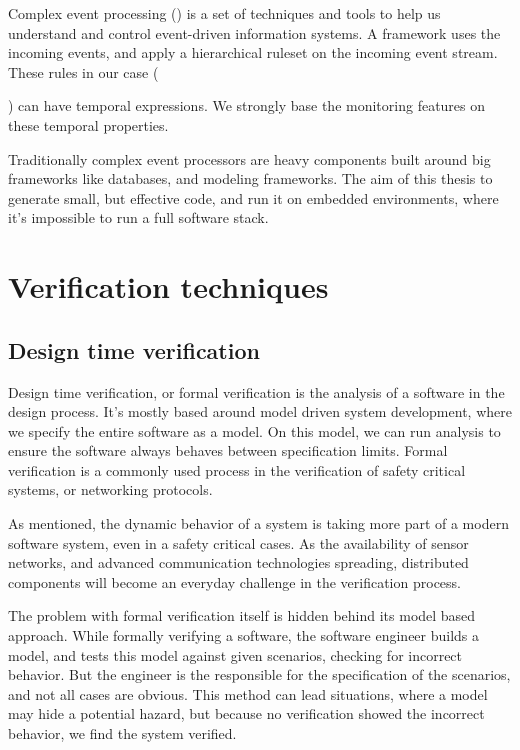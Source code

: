 Complex event processing () is a set of techniques and tools to help us understand and control event-driven information systems.\citep{Luckham:2001:PEI:515781} A  framework uses the incoming events, and apply a hierarchical ruleset on the incoming event stream. These rules in our case ({) can have temporal expressions. We strongly base the monitoring features on these temporal properties.

Traditionally complex event processors are heavy components built around big frameworks like databases, and modeling frameworks. The aim of this thesis to generate small, but effective code, and run it on embedded environments, where it's impossible to run a full  software stack.

\section{Verification techniques}

\subsection{Design time verification}

Design time verification, or formal verification is the analysis of a software in the design process. It's mostly based around model driven system development, where we specify the entire software as a model. On this model, we can run analysis to ensure the software always behaves between specification limits. Formal verification is a commonly used process in the verification of safety critical systems, or networking protocols.

As mentioned, the dynamic behavior of a system is taking more part of a modern software system, even in a safety critical cases. As the availability of sensor networks, and advanced communication technologies spreading, distributed components will become an everyday challenge in the verification process.

The problem with formal verification itself is hidden behind its model based approach. While formally verifying a software, the software engineer builds a model, and tests this model against given scenarios, checking for incorrect behavior. But the engineer is the responsible for the specification of the scenarios, and not all cases are obvious. This method can lead situations, where a model may hide a potential hazard, but because no verification showed the incorrect behavior, we find the system verified.

}
